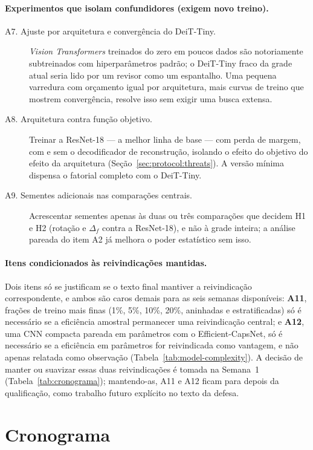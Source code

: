 \paragraph{Experimentos que isolam confundidores (exigem novo treino).}
\begin{description}
  \item[A7. Ajuste por arquitetura e convergência do DeiT-Tiny.] \emph{Vision
  Transformers} treinados do zero em poucos dados são notoriamente
  subtreinados com hiperparâmetros padrão; o DeiT-Tiny fraco da grade atual seria
  lido por um revisor como um espantalho. Uma pequena varredura com orçamento
  igual por arquitetura, mais curvas de treino que mostrem convergência, resolve
  isso sem exigir uma busca extensa.
  \item[A8. Arquitetura contra função objetivo.] Treinar a ResNet-18 --- a
  melhor linha de base --- com perda de margem, com e sem o decodificador de
  reconstrução, isolando o efeito do objetivo do efeito da arquitetura
  (Seção~\ref{sec:protocol:threats}). A versão mínima dispensa o fatorial
  completo com o DeiT-Tiny.
  \item[A9. Sementes adicionais nas comparações centrais.] Acrescentar sementes
  apenas às duas ou três comparações que decidem H1 e H2 (rotação e
  $\Delta_f$ contra a ResNet-18), e não à grade inteira; a análise pareada do
  item A2 já melhora o poder estatístico sem isso.
\end{description}

\paragraph{Itens condicionados às reivindicações mantidas.}
Dois itens só se justificam se o texto final mantiver a reivindicação
correspondente, e ambos são caros demais para as seis semanas disponíveis:
\textbf{A11}, frações de treino mais finas (1\%, 5\%, 10\%, 20\%, aninhadas e
estratificadas) só é necessário se a eficiência amostral permanecer uma
reivindicação central; e \textbf{A12}, uma CNN compacta pareada em parâmetros
com o Efficient-CapsNet, só é necessário se a eficiência em parâmetros for
reivindicada como vantagem, e não apenas relatada como observação
(Tabela~\ref{tab:model-complexity}). A decisão de manter ou suavizar essas duas
reivindicações é tomada na Semana~1 (Tabela~\ref{tab:cronograma}); mantendo-as,
A11 e A12 ficam para depois da qualificação, como trabalho futuro explícito no
texto da defesa.

\section{Cronograma}
\label{sec:conc:cronograma}


